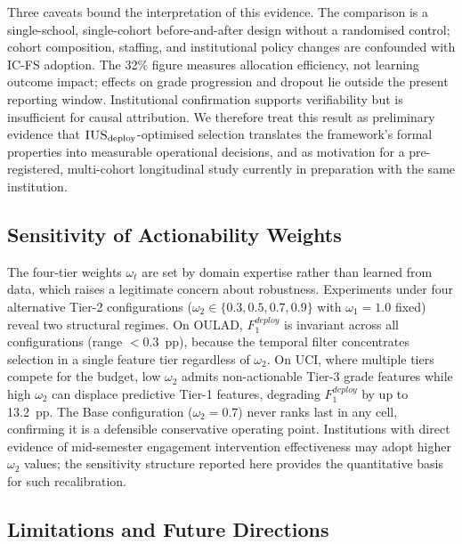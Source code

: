 \documentclass[a4paper,fleqn]{cas-sc}
\begin{document}
Three caveats bound the interpretation of this evidence. The comparison is a single-school, single-cohort before-and-after design without a randomised control; cohort composition, staffing, and institutional policy changes are confounded with IC-FS adoption. The 32\% figure measures allocation efficiency, not learning outcome impact; effects on grade progression and dropout lie outside the present reporting window. Institutional confirmation supports verifiability but is insufficient for causal attribution. We therefore treat this result as preliminary evidence that $\textsc{IUS}_{\text{deploy}}$-optimised selection translates the framework's formal properties into measurable operational decisions, and as motivation for a pre-registered, multi-cohort longitudinal study currently in preparation with the same institution.

\subsection{Sensitivity of Actionability Weights}
\label{sec:discussion:sensitivity}

The four-tier weights $\omega_t$ are set by domain expertise rather than learned from data, which raises a legitimate concern about robustness. Experiments under four alternative Tier-2 configurations ($\omega_2 \in \{0.3, 0.5, 0.7, 0.9\}$ with $\omega_1 = 1.0$ fixed) reveal two structural regimes. On OULAD, $F^{deploy}_1$ is invariant across all configurations (range $< 0.3$~pp), because the temporal filter concentrates selection in a single feature tier regardless of $\omega_2$.
On UCI, where multiple tiers compete for the budget, low $\omega_2$ admits non-actionable Tier-3 grade features while high $\omega_2$ can displace predictive Tier-1 features, degrading $F^{deploy}_1$ by up to 13.2~pp.
The Base configuration ($\omega_2 = 0.7$) never ranks last in any cell, confirming it is a defensible conservative operating point.
Institutions with direct evidence of mid-semester engagement intervention effectiveness may adopt higher $\omega_2$ values; the sensitivity structure reported here provides the quantitative basis for such recalibration.

\subsection{Limitations and Future Directions}
\label{sec:discussion:limits}
\end{document}
